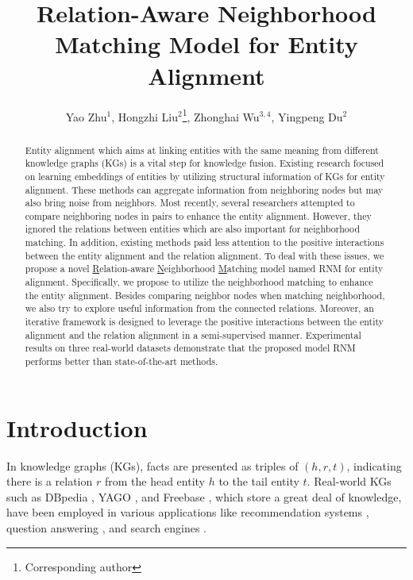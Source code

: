 \documentclass[letterpaper]{article} %
\title{Relation-Aware Neighborhood Matching Model for Entity Alignment}
\author {
    Yao Zhu$^1$,
    Hongzhi Liu$^2$\thanks{Corresponding author},
    Zhonghai Wu$^{3,4}$,
    Yingpeng Du$^2$\\
}
\begin{document}
\maketitle

\begin{abstract}
Entity alignment which aims at linking entities with the same
meaning from different knowledge graphs (KGs) is a vital step for
knowledge fusion. Existing research focused on learning embeddings
of entities by utilizing structural information of KGs for entity
alignment. These methods can aggregate information from
neighboring nodes but may also bring noise from neighbors.
Most recently, several researchers attempted to compare neighboring
nodes in pairs to enhance the entity alignment. However, they
ignored the relations between entities which are also important for
neighborhood matching. In addition, existing methods paid less
attention to the positive interactions between the entity alignment
and the relation alignment. To deal with these issues, we propose a
novel \underline{R}elation-aware \underline{N}eighborhood
\underline{M}atching model named RNM for entity alignment.
Specifically, we propose to utilize the neighborhood matching to
enhance the entity alignment. Besides comparing neighbor nodes when
matching neighborhood, we also try to explore useful information from the
connected relations. Moreover, an iterative framework is designed to
leverage the positive interactions between the entity alignment and
the relation alignment in a semi-supervised manner. Experimental
results on three real-world datasets demonstrate that the proposed
model RNM performs better than state-of-the-art methods.
\end{abstract}



\section{Introduction}

In knowledge graphs (KGs), facts are presented as triples of
$(h,r,t)$, indicating there is a relation $r$ from the head entity
$h$ to the tail entity $t$. Real-world KGs such as DBpedia
\cite{lehmann2015dbpedia}, YAGO \cite{suchanek2007yago}, and
Freebase \cite{bollacker2008freebase}, which store a great deal of
knowledge, have been employed in various applications like
recommendation systems \cite{cao2019unifying}, question answering
\cite{huang2019knowledge}, and search engines
\cite{xiong2017explicit}.
\end{document}
